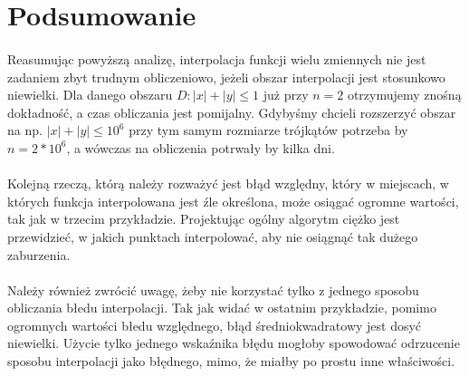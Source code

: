 \documentclass[12pt, leqno]{article}
\begin{document}
    \section{Podsumowanie}
        \paragraph{}
        Reasumując powyższą analizę, interpolacja funkcji wielu zmiennych nie jest zadaniem zbyt
        trudnym obliczeniowo, jeżeli obszar interpolacji jest stosunkowo niewielki. Dla danego obszaru
        $D: |x| + |y| \leq 1$ już przy $n=2$ otrzymujemy znośną dokładność, a czas obliczania jest pomijalny.
        Gdybyśmy chcieli rozszerzyć obszar na np. $|x| + |y| \leq 10^6$ przy tym samym rozmiarze 
        trójkątów potrzeba by $n = 2*10^6$, a wówczas na obliczenia potrwały by kilka dni.
        \paragraph{}
        Kolejną rzeczą, którą należy rozważyć jest błąd względny, który w miejscach, w których funkcja
        interpolowana jest źle określona, może osiągać ogromne wartości, tak jak w trzecim przykładzie.
        Projektując ogólny algorytm ciężko jest przewidzieć, w jakich punktach interpolować, aby nie
        osiągnąć tak dużego zaburzenia.
        \paragraph{}
        Należy również zwrócić uwagę, żeby nie korzystać tylko z jednego sposobu obliczania błedu
        interpolacji. Tak jak widać w ostatnim przykładzie, pomimo ogromnych wartości błedu względnego,
        błąd średniokwadratowy jest dosyć niewielki. Użycie tylko jednego wskaźnika błędu mogłoby spowodować 
        odrzucenie sposobu interpolacji jako błędnego, mimo, że miałby po prostu inne właściwości.
\end{document}
